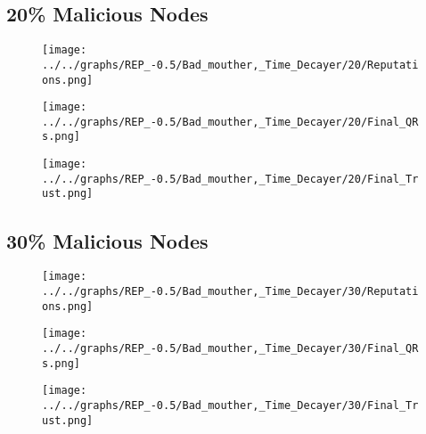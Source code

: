 \begin{minipage}[t]{0.49\columnwidth}
\subsection*{20\% Malicious Nodes}
    \begin{figure}[H]
        \centering
        \texttt{[image: ../../graphs/REP\_-0.5/Bad\_mouther,\_Time\_Decayer/20/Reputations.png]}
    \end{figure}
    \begin{figure}[H]
        \centering
        \texttt{[image: ../../graphs/REP\_-0.5/Bad\_mouther,\_Time\_Decayer/20/Final\_QRs.png]}
    \end{figure}
\end{minipage}
\begin{minipage}[t]{0.49\columnwidth}
    \begin{figure}[H]
        \centering
        \texttt{[image: ../../graphs/REP\_-0.5/Bad\_mouther,\_Time\_Decayer/20/Final\_Trust.png]}
    \end{figure}
\end{minipage}

\begin{minipage}[t]{0.49\columnwidth}
\subsection*{30\% Malicious Nodes}
    \begin{figure}[H]
        \centering
        \texttt{[image: ../../graphs/REP\_-0.5/Bad\_mouther,\_Time\_Decayer/30/Reputations.png]}
    \end{figure}
    \begin{figure}[H]
        \centering
        \texttt{[image: ../../graphs/REP\_-0.5/Bad\_mouther,\_Time\_Decayer/30/Final\_QRs.png]}
    \end{figure}
\end{minipage}
\begin{minipage}[t]{0.49\columnwidth}
    \begin{figure}[H]
        \centering
        \texttt{[image: ../../graphs/REP\_-0.5/Bad\_mouther,\_Time\_Decayer/30/Final\_Trust.png]}
    \end{figure}
\end{minipage}

